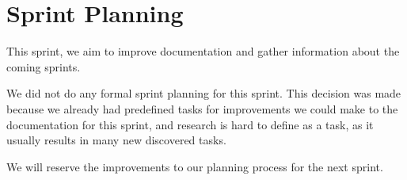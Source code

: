 \section{Sprint Planning}
This sprint, we aim to improve documentation and gather information about the coming sprints.

We did not do any formal sprint planning for this sprint. This decision was made because we already had predefined tasks for improvements we could make to the documentation for this sprint, and research is hard to define as a task, as it usually results in many new discovered tasks.

We will reserve the improvements to our planning process for the next sprint.

